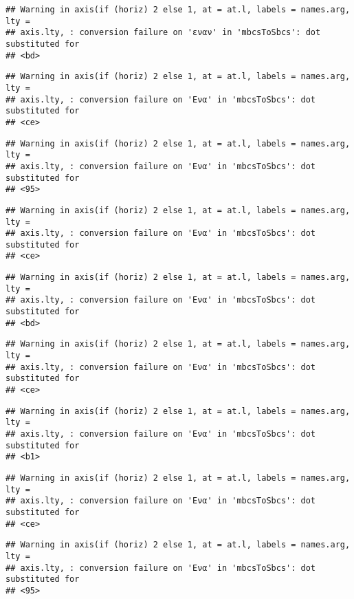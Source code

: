 \documentclass[
]{article}
\begin{document}
\begin{verbatim}
## Warning in axis(if (horiz) 2 else 1, at = at.l, labels = names.arg, lty =
## axis.lty, : conversion failure on 'εναν' in 'mbcsToSbcs': dot substituted for
## <bd>
\end{verbatim}

\begin{verbatim}
## Warning in axis(if (horiz) 2 else 1, at = at.l, labels = names.arg, lty =
## axis.lty, : conversion failure on 'Ενα' in 'mbcsToSbcs': dot substituted for
## <ce>
\end{verbatim}

\begin{verbatim}
## Warning in axis(if (horiz) 2 else 1, at = at.l, labels = names.arg, lty =
## axis.lty, : conversion failure on 'Ενα' in 'mbcsToSbcs': dot substituted for
## <95>
\end{verbatim}

\begin{verbatim}
## Warning in axis(if (horiz) 2 else 1, at = at.l, labels = names.arg, lty =
## axis.lty, : conversion failure on 'Ενα' in 'mbcsToSbcs': dot substituted for
## <ce>
\end{verbatim}

\begin{verbatim}
## Warning in axis(if (horiz) 2 else 1, at = at.l, labels = names.arg, lty =
## axis.lty, : conversion failure on 'Ενα' in 'mbcsToSbcs': dot substituted for
## <bd>
\end{verbatim}

\begin{verbatim}
## Warning in axis(if (horiz) 2 else 1, at = at.l, labels = names.arg, lty =
## axis.lty, : conversion failure on 'Ενα' in 'mbcsToSbcs': dot substituted for
## <ce>
\end{verbatim}

\begin{verbatim}
## Warning in axis(if (horiz) 2 else 1, at = at.l, labels = names.arg, lty =
## axis.lty, : conversion failure on 'Ενα' in 'mbcsToSbcs': dot substituted for
## <b1>
\end{verbatim}

\begin{verbatim}
## Warning in axis(if (horiz) 2 else 1, at = at.l, labels = names.arg, lty =
## axis.lty, : conversion failure on 'Ενα' in 'mbcsToSbcs': dot substituted for
## <ce>
\end{verbatim}

\begin{verbatim}
## Warning in axis(if (horiz) 2 else 1, at = at.l, labels = names.arg, lty =
## axis.lty, : conversion failure on 'Ενα' in 'mbcsToSbcs': dot substituted for
## <95>
\end{verbatim}
\end{document}

